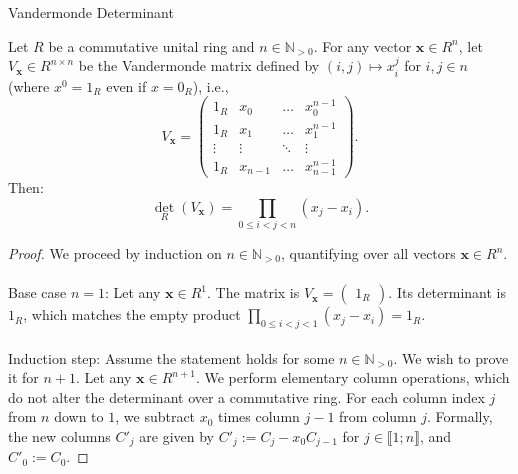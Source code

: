 \begin{appendixitem}{Vandermonde Determinant}
    \begin{lemma}
        Let \( R \) be a commutative unital ring and \( n \in \mathbb{N}_{>0} \). For any vector \( \boldsymbol{x} \in R^n \), let \( V_{\boldsymbol{x}} \in R^{n \times n} \) be the Vandermonde matrix defined by \( \left(i,j\right) \mapsto x_i^j \) for \( i, j \in n \) (where \( x^0 = 1_R \) even if \( x = 0_R \)), i.e.,
        \[
            V_{\boldsymbol{x}} = \begin{pmatrix}
                1_R & x_0 & \dots & x_0^{n-1} \\
                1_R & x_1 & \dots & x_1^{n-1} \\
                \vdots & \vdots & \ddots & \vdots \\
                1_R & x_{n-1} & \dots & x_{n-1}^{n-1}
            \end{pmatrix}.
        \]
        Then:
        \[
            \operatorname{det}_R\left(V_{\boldsymbol{x}}\right) = \prod_{0 \leq i < j < n} \left(x_j - x_i\right).
        \]
    \end{lemma}
    \begin{proof}
        We proceed by induction on \( n \in \mathbb{N}_{>0} \), quantifying over all vectors \( \boldsymbol{x} \in R^n \).
        \\\\
        Base case \( n = 1 \): Let any \( \boldsymbol{x} \in R^1 \). The matrix is \( V_{\boldsymbol{x}} = \begin{pmatrix} 1_R \end{pmatrix} \). Its determinant is \( 1_R \), which matches the empty product \( \prod_{0 \leq i < j < 1} \left(x_j - x_i\right) = 1_R \).
        \\\\
        Induction step: Assume the statement holds for some \( n \in \mathbb{N}_{>0} \). We wish to prove it for \( n+1 \). Let any \( \boldsymbol{x} \in R^{n+1} \). We perform elementary column operations, which do not alter the determinant over a commutative ring. For each column index \( j \) from \( n \) down to \( 1 \), we subtract \( x_0 \) times column \( j-1 \) from column \( j \). Formally, the new columns \( C'_j \) are given by \( C'_j := C_j - x_0 C_{j-1} \) for \( j \in \llbracket 1;n \rrbracket \), and \( C'_0 := C_0 \).

\end{proof}
\end{appendixitem}

